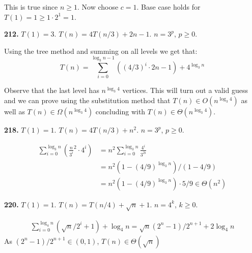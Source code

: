 \documentclass[11pt,a4paper]{article}
\renewcommand{\geq}{\geqslant}
\begin{document}
This is true since $n \geq 1$. Now choose $c = 1$. Base case holds for $T(1) = 1 \geq 1 \cdot 2^{1} = 1$.

\noindent\textbf{212.} $T(1) = 3$. $T(n) = 4T(n/3) + 2n - 1$. $n = 3^p$, $p \geq 0$.

Using the tree method and summing on all levels we get that:
\begin{equation*}
	T(n) = \sum_{i = 0}^{\log_3 n - 1}((4/3)^i \cdot 2 n - 1) + 4^{\log_3 n}
\end{equation*}


Observe that the last level has $n^{\log_3 4}$ vertices. This will turn out a valid guess and we can prove using the substitution method that $T(n) \in O(n^{\log_3 4})$ as well as $T(n) \in \Omega(n^{\log_3 4})$ concluding with $T(n) \in \Theta(n^{\log_3 4})$.


\noindent\textbf{218.} $T(1) = 1$. $T(n) = 4T(n/3) + n^2$. $n = 3^p$, $p \geq 0$.

\begin{equation}
\begin{split}
	\sum_{i = 0}^{\log_3 n}{(\frac{n}{3^i}^2 \cdot 4^i)} &= n^2 \sum_{i = 0}^{\log_3 n}{\frac{4^i}{3^{2i}}} \\
	&= n^2(1 - (4/9)^{\log_3 n}) / (1 - 4/9) \\
	&= n^2 (1 - (4/9)^{\log_3 n}) \cdot 5/9 \in \Theta(n^2)
\end{split}
\end{equation}

\noindent\textbf{220.} $T(1) = 1$. $T(n) = T(n/4) + \sqrt{n} + 1$. $n = 4^k$, $k \geq 0$.

\begin{equation}
\begin{split}
	\sum_{i=0}^{\log_4 n}(\sqrt n/2^i + 1) + \log_4 n= \sqrt n (2^n - 1) / 2^{n+1} + 2 \log_4 n
\end{split}
\end{equation}
As $(2^n - 1) / 2^{n+1} \in (0, 1)$, $T(n) \in \Theta(\sqrt n)$
\end{document}
